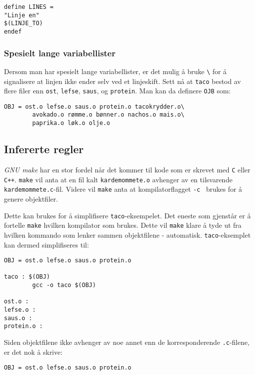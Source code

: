 \begin{alphasection}
\begin{lstlisting}
define LINES =
"Linje en"
$(LINJE_TO)
endef
\end{lstlisting}

\subsubsection{Spesielt lange variabellister}

Dersom man har spesielt lange variabellister, er det mulig å bruke \verb|\| for å signalisere at linjen ikke ender selv ved et linjeskift. Sett nå at \verb|taco| bestod av flere filer enn \verb|ost|, \verb|lefse|, \verb|saus|, og \verb|protein|. Man kan da definere \verb|OJB| som:

\begin{lstlisting}
OBJ = ost.o lefse.o saus.o protein.o tacokrydder.o\
        avokado.o rømme.o bønner.o nachos.o mais.o\
        paprika.o løk.o olje.o
\end{lstlisting}

\subsection{Infererte regler}

\textit{GNU make} har en stor fordel når det kommer til kode som er skrevet med \verb|C| eller \verb|C++|. \verb|make| vil anta at en fil kalt \verb|kardemommete.o| avhenger av en tilsvarende \verb|kardemommete.c|-fil. Videre vil \verb|make| anta at kompilatorflagget \verb|-c| \ brukes for å genere objektfiler. 

Dette kan brukes for å simplifisere \verb|taco|-eksempelet. Det eneste som gjenstår er å fortelle \verb|make| hvilken kompilator som brukes. Dette vil \verb|make| klare å tyde ut fra hvilken kommando som lenker sammen objektfilene - automatisk. \verb|taco|-eksemplet kan dermed simplifiseres til:



\begin{lstlisting}
OBJ = ost.o lefse.o saus.o protein.o

taco : $(OBJ)
        gcc -o taco $(OBJ)

ost.o :
lefse.o :
saus.o :
protein.o :
\end{lstlisting}

Siden objektfilene ikke avhenger av noe annet enn de korresponderende \verb|.c|-filene, er det nok å skrive:

\begin{lstlisting}
OBJ = ost.o lefse.o saus.o protein.o


\end{lstlisting}
\end{alphasection}
